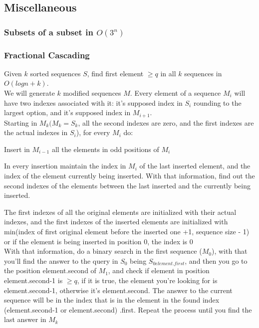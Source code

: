 \documentclass[a4paper,12pt]{article}
\begin{document}
\newpage

\subsection{Miscellaneous}

\subsubsection{Subsets of a subset in $O(3^n)$}


\subsubsection{Fractional Cascading}
Given $k$ sorted sequences $S$, find first element $\geq q$ in all $k$ sequences in $O(log n + k)$.\\
We will generate $k$ modified sequences $M$. Every element of a sequence $M_{i}$ will have two indexes associated with it: it's supposed index in $S_{i}$ rounding to the largest option,
and it's supposed index in $M_{i+1}$.\\
Starting in $M_{k} (M_{k} = S_{k}$, all the second indexes are zero, and the first indexes are the actual indexes in $S_{i}$), for every $M_{i}$ do:

    Insert in $M_{i-1}$ all the elements in odd positions of $M_{i}$
    
    In every insertion maintain the index in $M_{i}$ of the last inserted element, and the index of the element currently being inserted.
    With that information, find out the second indexes of the elements between the last inserted and the currently being inserted.
    
    The first indexes of all the original elements are initialized with their actual indexes, and the first indexes of the inserted elements are initialized with min(index of first original element before the inserted one +1, sequence size - 1)
    or if the element is being inserted in position 0, the index is 0\\
    
With that information, do a binary search in the first sequence ($M_{0}$), with that you'll find the answer to the query in $S_{0}$ being $S_{0{element.first}}$, and then you go to the position element.second of $M_{1}$, and check if element in position element.second-1 is $\geq q$, if it is true, the element you're looking for is element.second-1, otherwise it's element.second. The answer to the current sequence will be in the index that is in the element in the found index (element.second-1 or element.second) .first. Repeat the process until you find the last answer in $M_{k}$
\end{document}
